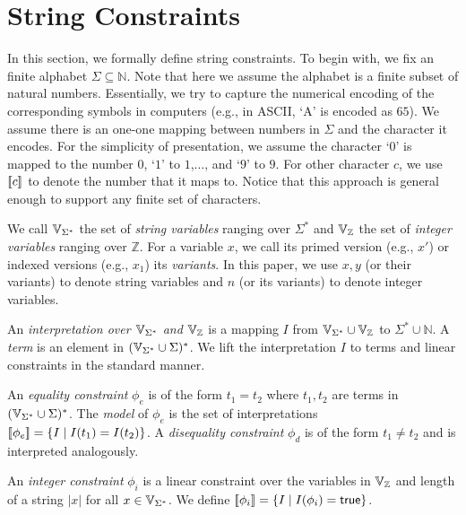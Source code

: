 \documentclass[sigplan,review,anonymous]{acmart}\settopmatter{printfolios=true,printccs=false,printacmref=false}
\begin{document}
\section{String Constraints} \label{section:sc}


In this section, we formally define string constraints. To begin with, we fix an finite alphabet $\Sigma \subseteq \mathbb{N}$. Note that here we assume the alphabet is a finite subset of natural numbers. Essentially, we try to capture the numerical encoding of the corresponding symbols in computers (e.g., in ASCII, `A' is encoded as $65$). We assume there is an one-one mapping between numbers in $\Sigma$ and the character it encodes. For the simplicity of presentation, we assume the character `$0$' is mapped to the number $0$, `$1$' to $1$,$\ldots$, and `$9$' to $9$. For other character $c$, we use $[\![c]\!]$ to denote the number that it maps to. Notice that this approach is general enough to support any finite set of characters. 


We call $\mbox{$\mathbb{V}_{\Sigma^*}$}$ the set of \emph{string variables} ranging over $\Sigma^*$ and $\mbox{$\mathbb{V}_{\mathbb{Z}}$}$ the set of \emph{integer variables} ranging over $\mathbb{Z}$.
For a variable $x$, we call its primed version (e.g., $x'$) or indexed versions (e.g., $x_1$) its \emph{variants}.
In this paper, we use $x,y$ (or their variants) to denote string variables and $n$ (or its variants) to denote integer variables.

An \emph{interpretation over $\mbox{$\mathbb{V}_{\Sigma^*}$}$ and $\mbox{$\mathbb{V}_{\mathbb{Z}}$}$} is a mapping $I$ from $\mbox{$\mathbb{V}_{\Sigma^*}$}\cup \mbox{$\mathbb{V}_{\mathbb{Z}}$}$ to $\Sigma^* \cup \mathbb{N}$. A \emph{term} is an element in $(\mbox{$\mathbb{V}_{\Sigma^*}$}\cup \Sigma)^*$. We lift the interpretation $I$ to terms and linear constraints in the standard manner. 

An \emph{equality constraint} $\phi_e$ is of the form $t_1 = t_2$ where $t_1, 
t_2$ are terms in $(\mbox{$\mathbb{V}_{\Sigma^*}$}\cup \Sigma)^*$. The \emph{model} of $\phi_e$ is the set of interpretations $[\![\phi_e]\!]=\{I\mid 
I(t_1)=I(t_2)\}$. A \emph{disequality constraint} $\phi_d$ is of the form $t_1 \neq 
t_2$ and is interpreted analogously.

An \emph{integer constraint} $\phi_i$ is a linear constraint over the variables in $\mbox{$\mathbb{V}_{\mathbb{Z}}$}$ and length of a string $|x|$ for all $x \in \mbox{$\mathbb{V}_{\Sigma^*}$}$.
We define  $[\![\phi_i]\!]= \{I \mid I(\phi_i)= \mbox{$\mathsf{true}$} \}$.
\end{document}
